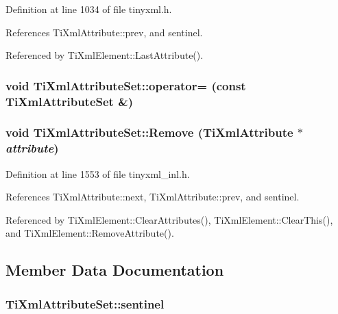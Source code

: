 Definition at line 1034 of file tinyxml.h.

References TiXmlAttribute::prev, and sentinel.

Referenced by TiXmlElement::LastAttribute().\hypertarget{class_ti_xml_attribute_set_a977f5b50c94e7b6beb01875298fa14a2}{
\subsubsection[{operator=}]{\setlength{\rightskip}{0pt plus 5cm}void TiXmlAttributeSet::operator= (const {\bf TiXmlAttributeSet} \&)}}
\label{class_ti_xml_attribute_set_a977f5b50c94e7b6beb01875298fa14a2}
\hypertarget{class_ti_xml_attribute_set_a924a73d071f2573f9060f0be57879c57}{
\subsubsection[{Remove}]{\setlength{\rightskip}{0pt plus 5cm}void TiXmlAttributeSet::Remove ({\bf TiXmlAttribute} $\ast$ {\em attribute})}}
\label{class_ti_xml_attribute_set_a924a73d071f2573f9060f0be57879c57}


Definition at line 1553 of file tinyxml\_\-inl.h.

References TiXmlAttribute::next, TiXmlAttribute::prev, and sentinel.

Referenced by TiXmlElement::ClearAttributes(), TiXmlElement::ClearThis(), and TiXmlElement::RemoveAttribute().

\subsection{Member Data Documentation}
\hypertarget{class_ti_xml_attribute_set_a1fda20434a148e7d09dd3ecc8e85db9c}{
\subsubsection[{sentinel}]{ {\bf TiXmlAttributeSet::sentinel}}}
\label{class_ti_xml_attribute_set_a1fda20434a148e7d09dd3ecc8e85db9c}


